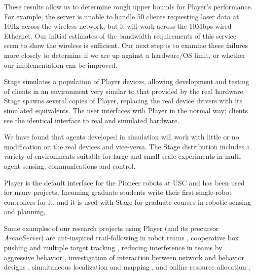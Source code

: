 These results allow us to determine rough upper bounds for Player's
performance.  For example, the server is unable to handle 50 clients
requesting laser data at 10Hz across the wireless network, but it will
work across the 10Mbps wired Ethernet.  Our initial estimates of the
bandwidth requirements of this service seem to show the wireless is
sufficient. Our next step is to examine these failures more closely to
determine if we are up against a hardware/OS limit, or whether our
implementation can be improved.



\label{stage}
Stage simulates a population of Player devices, allowing development
and testing of clients in an environment very similar to that provided
by the real hardware. Stage spawns several copies of Player, replacing
the real device drivers with its simulated equivalents. The user
interfaces with Player in the normal way; clients see the identical
interface to real and simulated hardware. 


We have found that agents developed in simulation will work with
little or no modification on the real devices and vice-versa. The
Stage distribution includes a variety of environments suitable for
large and small-scale experiments in multi-agent sensing,
communications and control.

\label{usage}
Player is the default interface for the Pioneer robots at USC and has
been used for many projects. Incoming graduate students write their
first single-robot controllers for it, and it is used with Stage for
graduate courses in robotic sensing and planning,

Some examples of our research projects using Player (and its precursor
{\it ArenaServer}) are ant-inspired trail-following in robot teams
\cite{VaughanStoySukhatmeMataric00}, cooperative box pushing and multiple target
tracking \cite{GerkeyMataric00}, reducing interference in teams by
aggressive behavior \cite{VaughanStoySukhatmeMataric00a}, investigation of
interaction between network and behavior designs \cite{weiye2000},
simultaneous localization and mapping \cite{HowardMataricSukhatme01}, 
and online resource allocation \cite{OstergaardMataricSukhatme01}.


